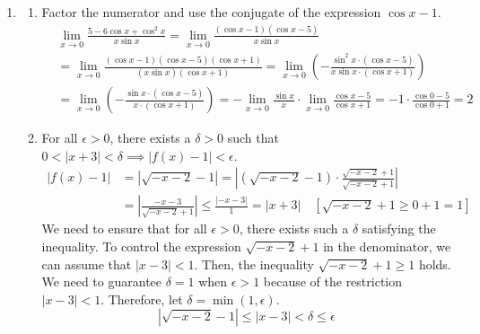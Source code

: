 \documentclass[a4paper, 12pt]{article}
\begin{document}
\begin{enumerate}[leftmargin=*,label=\textbf{\arabic*.}]
\item
\begin{enumerate}[leftmargin=*,label=\textbf{\alph*.}]
\item Factor the numerator and use the conjugate of the expression $\cos x-1$.
\begin{align*}
&\lim_{x\to0}\frac{5-6\cos x + \cos^2x}{x\sin x}=\lim_{x\to0}\frac{(\cos x -1)(\cos x-5)}{x\sin x} \\[1em]&=\lim_{x\to0}\frac{(\cos x -1)(\cos x-5)(\cos x +1)}{(x\sin x)(\cos x +1)}
=\lim_{x\to0}\left(-\frac{\sin^2x\cdot(\cos x -5)}{x\sin x \cdot(\cos x +1)}\right)\\[1em]&=\lim_{x\to0}\left(-\frac{\sin x\cdot(\cos x -5)}{x \cdot(\cos x +1)}\right)=-\lim_{x\to0}\frac{\sin{x}} x\cdot \lim_{x\to0}\frac{\cos x -5}{\cos x +1}=-1\cdot\frac{\cos0 -5}{\cos0+1} = \boxed{2}
\end{align*}

\item For all $\epsilon > 0$, there exists a $\delta > 0$ such that $0<\left|x+3\right|<\delta\implies\left|f(x)-1\right|<\epsilon$.
\begin{align*}
\left|f(x)-1\right|&=\left|\sqrt{-x-2}-1\right|=\left|\left(\sqrt{-x-2}-1\right)\cdot\frac{\sqrt{-x-2}+1}{\sqrt{-x-2}+1}\right|\\[1em]&=\left|\frac{-x-3}{\sqrt{-x-2}+1}\right|\leq\frac{\left|-x-3\right|}1=|x+3|\quad\left[\sqrt{-x-2}+1\geq0+1=1\right]
\end{align*}
We need to ensure that for all $\epsilon>0$, there exists such a $\delta$ satisfying the inequality. To control the expression $\sqrt{-x-2}+1$ in the denominator, we can assume that $|x-3|<1$. Then, the inequality $\sqrt{-x-2}+1\geq1$ holds. We need to guarantee $\delta =1$ when $\epsilon >1$ because of the restriction $|x-3|<1$. Therefore, let $\delta=\min(1,\epsilon)$.
\[\left|\sqrt{-x-2}-1\right|\leq|x-3|<\boxed{\delta\leq\epsilon}\]


\end{enumerate}
\end{enumerate}
\end{document}
